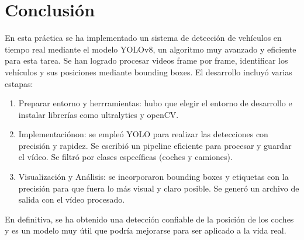 \section{Conclusión}
En esta práctica se ha implementado un sistema de detección de vehículos en tiempo real mediante el modelo YOLOv8, un algoritmo muy avanzado y eficiente para esta tarea.  Se han logrado procesar videos frame por frame, identificar los vehículos y sus posiciones mediante bounding boxes.  
El desarrollo incluyó varias estapas:
\begin{enumerate}
    \item Preparar entorno y herrramientas: hubo que elegir el entorno de desarrollo e instalar librerías como ultralytics y openCV.
    \item Implementaciónon: se empleó YOLO para realizar las detecciones con precisión y rapidez.  Se escribió un pipeline eficiente para procesar y guardar el vídeo.  Se filtró por clases específicas (coches y camiones).
    \item Visualización y Análisis: se incorporaron bounding boxes y etiquetas con la precisión para que fuera lo más visual y claro posible.  Se generó un archivo de salida con el vídeo procesado.
\end{enumerate}
En definitiva, se ha obtenido una detección confiable de la posición de los coches y es un modelo muy útil que podría mejorarse para ser aplicado a la vida real.
